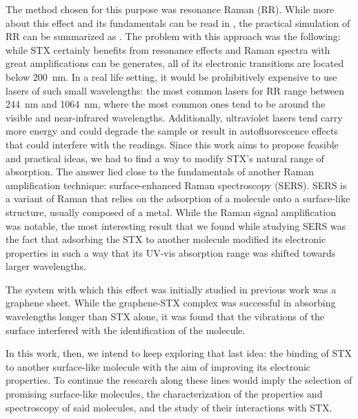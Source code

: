The method chosen for this purpose was resonance Raman (RR).
While more about this effect and its fundamentals can be read in , the practical simulation of RR can be summarized as .
The problem with this approach was the following: while STX certainly benefits from resonance effects and Raman spectra with great amplifications can be generates, all of its electronic transitions are located below \SI{200}{\nano\metre}.
In a real life setting, it would be prohibitively expensive to use lasers of such small wavelengths: the most common lasers for RR range between \SI{244}{\nano\metre} and \SI{1064}{\nano\metre}, where the most common ones tend to be around the visible and near-infrared wavelengths.\cite{karlsson18,horiba}
Additionally, ultraviolet lasers tend carry more energy and could degrade the sample or result in autofluorescence effects that could interfere with the readings.
Since this work aims to propose feasible and practical ideas, we had to find a way to modify STX's natural range of absorption.
The answer lied close to the fundamentals of another Raman amplification technique: surface-enhanced Raman spectroscopy (SERS).
SERS is a variant of Raman that relies on the adsorption of a molecule onto a surface-like structure, usually composed of a metal.
While the Raman signal amplification was notable, the most interesting result that we found while studying SERS was the fact that adsorbing the STX to another molecule modified its electronic properties in such a way that its UV-vis absorption range was shifted towards larger wavelengths.

The system with which this effect was initially studied in previous work was a graphene sheet.
While the graphene-STX complex was successful in absorbing wavelengths longer than STX alone, it was found that the vibrations of the surface interfered with the identification of the molecule.

In this work, then, we intend to keep exploring that last idea: the binding of STX to another surface-like molecule with the aim of improving its electronic properties.
To continue the research along these lines would imply the selection of promising surface-like molecules, the characterization of the properties and spectroscopy of said molecules, and the study of their interactions with STX.


